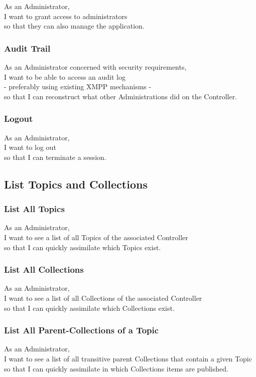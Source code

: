 As an Administrator,\\
I want to grant access to administrators \\
so that they can also manage the application.

\subsubsection{Audit Trail}

As an Administrator concerned with security requirements,\\
I want to be able to access an audit log\\
- preferably using existing XMPP mechanisms - \\
so that I can reconstruct what other Administrations did on the Controller.

\subsubsection{Logout}

As an Administrator,\\
I want to log out\\
so that I can terminate a session.

\subsection{List Topics and Collections}

\subsubsection{List All Topics}
As an Administrator,\\
I want to see a list of all Topics of the associated Controller\\
so that I can quickly assimilate which Topics exist.

\subsubsection{List All Collections}
As an Administrator,\\
I want to see a list of all Collections of the associated Controller\\
so that I can quickly assimilate which Collections exist.

\subsubsection{List All Parent-Collections of a Topic}
As an Administrator,\\
I want to see a list of all transitive parent Collections that contain a given Topic\\
so that I can quickly assimilate in which Collections items are published.

